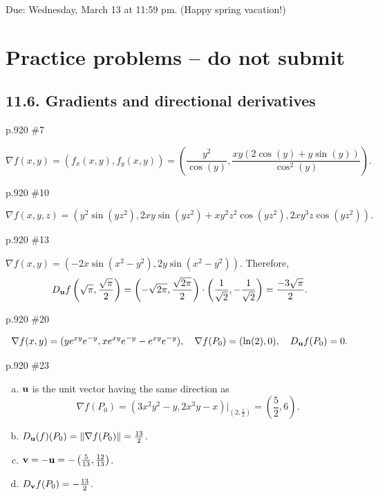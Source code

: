 \maketitle

Due: Wednesday, March 13 at 11:59 pm. (Happy spring vacation!)

\section{Practice problems -- do not submit}
\subsection*{11.6. Gradients and directional derivatives}
\begin{practice}p.920 \#7\end{practice}
\begin{pracsol}
  \[\nabla f(x,y)=(f_x(x,y),f_y(x,y))=\left(\frac{y^2}{\cos(y)},\frac{xy(2\cos(y)+y\sin(y))}{\cos^2(y)}\right).\]
\end{pracsol}
\begin{practice}p.920 \#10\end{practice}
\begin{pracsol}
  \[\nabla f(x,y,z)=(y^2\sin(yz^2),2xy\sin(yz^2)+xy^2z^2\cos(yz^2),2xy^3z\cos(yz^2)).\]
\end{pracsol}
\begin{practice}p.920 \#13\end{practice}
\begin{pracsol}
  $\nabla f(x,y)=(-2x\sin(x^2-y^2),2y\sin(x^2-y^2))$. Therefore,
  \[D_\mathbf u f\left(\sqrt\pi,\frac{\sqrt\pi}{2}\right)=\left(-\sqrt{2\pi},\frac{\sqrt{2\pi}}{2}\right)\cdot\left(\frac1{\sqrt2},-\frac1{\sqrt2}\right)=\frac{-3\sqrt{\pi}}{2}.\]
\end{pracsol}
\begin{practice}p.920 \#20\end{practice}
\begin{pracsol}
  \[\nabla f(x,y)=(ye^{xy}e^{-y},xe^{xy}e^{-y}-e^{xy}e^{-y}),\quad \nabla f(P_0)=(\ln(2),0),\quad D_\mathbf u f(P_0)=0.\]
\end{pracsol}
\begin{practice}p.920 \#23\end{practice}
\begin{pracsol}
  \begin{enumerate}[(a)]
    \item $\mathbf u$ is the unit vector having the same direction as
    \[\nabla f(P_0)=(3x^2y^2-y,2x^3y-x)\Big|_{(2,\frac12)}=\left(\frac52,6\right).\]
    \item $D_\mathbf u(f)(P_0)=\|\nabla f(P_0)\|=\frac{13}2$.
    \item $\mathbf v=-\mathbf u=-\left(\frac5{13},\frac{12}{13}\right)$.
    \item $D_\mathbf v f(P_0)=-\frac{13}2$.
  \end{enumerate}
\end{pracsol}
